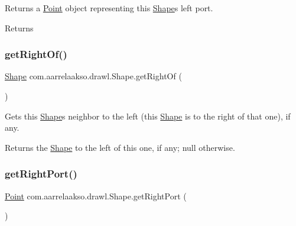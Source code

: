 Returns a \hyperlink{classcom_1_1aarrelaakso_1_1drawl_1_1_point}{Point} object representing this \hyperlink{classcom_1_1aarrelaakso_1_1drawl_1_1_shape}{Shape}\textquotesingle{}s left port. 

\begin{DoxyReturn}{Returns}

\end{DoxyReturn}
\mbox{\label{classcom_1_1aarrelaakso_1_1drawl_1_1_shape_a1ad573b06f341aa79f6a255a476ae6e4}} 
\subsubsection{\texorpdfstring{get\+Right\+Of()}{getRightOf()}}
{\footnotesize\ttfamily \hyperlink{classcom_1_1aarrelaakso_1_1drawl_1_1_shape}{Shape} com.\+aarrelaakso.\+drawl.\+Shape.\+get\+Right\+Of (\begin{DoxyParamCaption}{ }\end{DoxyParamCaption})\hspace{0.3cm}{\ttfamily [inherited]}}



Gets this \hyperlink{classcom_1_1aarrelaakso_1_1drawl_1_1_shape}{Shape}\textquotesingle{}s neighbor to the left (this \hyperlink{classcom_1_1aarrelaakso_1_1drawl_1_1_shape}{Shape} is to the right of that one), if any. 

\begin{DoxyReturn}{Returns}
the \hyperlink{classcom_1_1aarrelaakso_1_1drawl_1_1_shape}{Shape} to the left of this one, if any; {\ttfamily null} otherwise. 
\end{DoxyReturn}
\mbox{\label{classcom_1_1aarrelaakso_1_1drawl_1_1_shape_a319c78d425ec91e1aef1072a95e349ad}} 
\subsubsection{\texorpdfstring{get\+Right\+Port()}{getRightPort()}}
{\footnotesize\ttfamily \hyperlink{classcom_1_1aarrelaakso_1_1drawl_1_1_point}{Point} com.\+aarrelaakso.\+drawl.\+Shape.\+get\+Right\+Port (\begin{DoxyParamCaption}{ }\end{DoxyParamCaption})\hspace{0.3cm}{\ttfamily [inherited]}}



